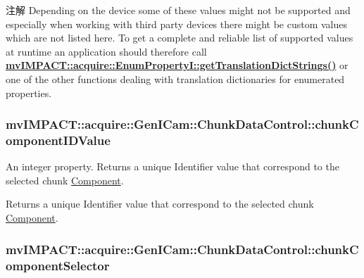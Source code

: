 \begin{DoxyNote}{注解}
Depending on the device some of these values might not be supported and especially when working with third party devices there might be custom values which are not listed here. To get a complete and reliable list of supported values at runtime an application should therefore call {\bfseries \hyperlink{classmv_i_m_p_a_c_t_1_1acquire_1_1_enum_property_i_a0ba6ccbf5ee69784d5d0b537924d26b6}{mv\+I\+M\+P\+A\+C\+T\+::acquire\+::\+Enum\+Property\+I\+::get\+Translation\+Dict\+Strings()}} or one of the other functions dealing with translation dictionaries for enumerated properties. 
\end{DoxyNote}
\hypertarget{classmv_i_m_p_a_c_t_1_1acquire_1_1_gen_i_cam_1_1_chunk_data_control_a9ff4b23f4b20e7aa48c31fa742a7b8fb}{
\subsubsection[{chunk\+Component\+I\+D\+Value}]{ mv\+I\+M\+P\+A\+C\+T\+::acquire\+::\+Gen\+I\+Cam\+::\+Chunk\+Data\+Control\+::chunk\+Component\+I\+D\+Value}}\label{classmv_i_m_p_a_c_t_1_1acquire_1_1_gen_i_cam_1_1_chunk_data_control_a9ff4b23f4b20e7aa48c31fa742a7b8fb}


An integer property. Returns a unique Identifier value that correspond to the selected chunk \hyperlink{classmv_i_m_p_a_c_t_1_1acquire_1_1_component}{Component}. 

Returns a unique Identifier value that correspond to the selected chunk \hyperlink{classmv_i_m_p_a_c_t_1_1acquire_1_1_component}{Component}. \hypertarget{classmv_i_m_p_a_c_t_1_1acquire_1_1_gen_i_cam_1_1_chunk_data_control_a5f1f17a1606e9ea9a5c660886422d5b7}{
\subsubsection[{chunk\+Component\+Selector}]{ mv\+I\+M\+P\+A\+C\+T\+::acquire\+::\+Gen\+I\+Cam\+::\+Chunk\+Data\+Control\+::chunk\+Component\+Selector}}\label{classmv_i_m_p_a_c_t_1_1acquire_1_1_gen_i_cam_1_1_chunk_data_control_a5f1f17a1606e9ea9a5c660886422d5b7}


